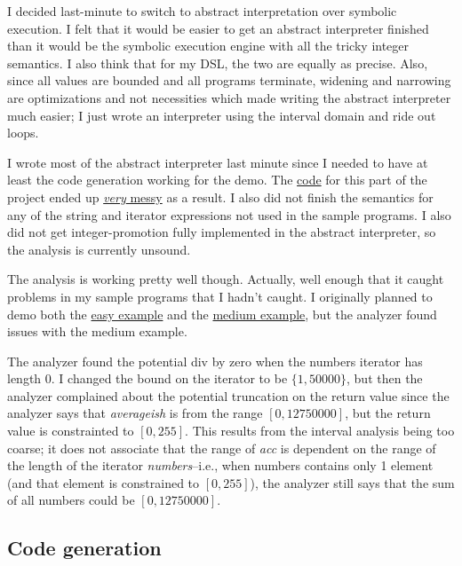 \documentclass[letterpaper]{article}
\begin{document}
I decided last-minute to switch to abstract interpretation
over symbolic execution. I felt that it would be easier to get
an abstract interpreter finished than it would be the symbolic
execution engine with all the tricky integer semantics. I also
think that for my DSL, the two are equally as precise. Also,
since all values are bounded and all programs terminate, widening
and narrowing are optimizations and not necessities which made
writing the abstract interpreter much easier; I just wrote an
interpreter using the interval domain and ride out loops.

I wrote most of the abstract interpreter last minute since I needed
to have at least the code generation working for the demo. The \href{https://github.com/Flandini/cse501project20au/blob/master/scala-dsl/dsl/src/main/scala/SafetyChecks.scala#L15}{code}
for this part of the project ended up \href{https://github.com/Flandini/cse501project20au/blob/master/scala-dsl/dsl/src/main/scala/SafetyChecks.scala#L218}{\textit{very} messy} as a result.
I also did not finish the semantics for any of the string and iterator
expressions not used in the sample programs. I also did not get
integer-promotion fully implemented in the abstract interpreter,
so the analysis is currently unsound.

The analysis is working pretty well though. Actually, well enough that it
caught problems in my sample programs that I hadn't caught. I originally planned to
demo both the \href{https://github.com/Flandini/cse501project20au/blob/master/samples/easy/single_line_dimacs_scanner.sal}{easy example}
and the \href{https://github.com/Flandini/cse501project20au/blob/master/samples/medium/array_average.sal}{medium example},
but the analyzer found issues with the medium example.

The analyzer found the potential div by zero when the numbers iterator
has length $0$. I changed the bound on the iterator to be $\{1, 50000\}$, but
then the analyzer complained about the potential truncation on the return
value since the analyzer says that \textit{averageish} is from the range
$[0, 12750000]$, but the return value is constrainted to $[0, 255]$. This
results from the interval analysis being too coarse; it does not associate
that the range of \textit{acc} is dependent on the range of the length of
the iterator \textit{numbers}--i.e., when numbers contains only 1 element
(and that element is constrained to $[0, 255]$), the analyzer still says
that the sum of all numbers could be $[0, 12750000]$.

\subsection{Code generation}
\end{document}
